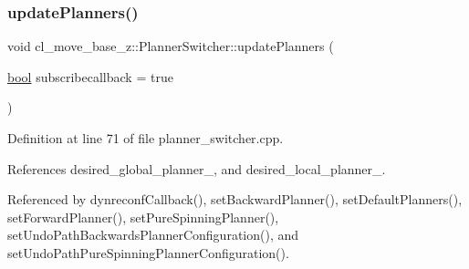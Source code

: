 \subsubsection{\texorpdfstring{update\+Planners()}{updatePlanners()}}
{\footnotesize\ttfamily void cl\+\_\+move\+\_\+base\+\_\+z\+::\+Planner\+Switcher\+::update\+Planners (\begin{DoxyParamCaption}\item[{\hyperlink{classbool}{bool}}]{subscribecallback = {\ttfamily true} }\end{DoxyParamCaption})\hspace{0.3cm}{\ttfamily [private]}}



Definition at line 71 of file planner\+\_\+switcher.\+cpp.



References desired\+\_\+global\+\_\+planner\+\_\+, and desired\+\_\+local\+\_\+planner\+\_\+.



Referenced by dynreconf\+Callback(), set\+Backward\+Planner(), set\+Default\+Planners(), set\+Forward\+Planner(), set\+Pure\+Spinning\+Planner(), set\+Undo\+Path\+Backwards\+Planner\+Configuration(), and set\+Undo\+Path\+Pure\+Spinning\+Planner\+Configuration().


